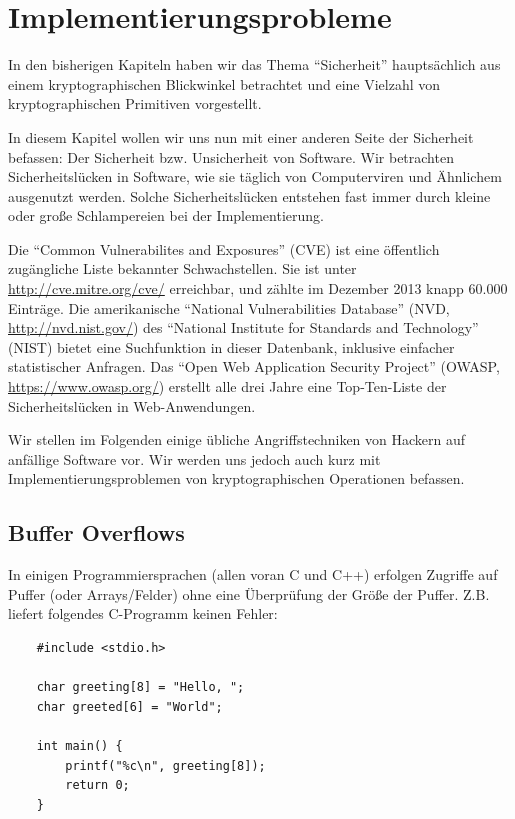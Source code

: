 
\chapter{Implementierungsprobleme}

In den bisherigen Kapiteln haben wir das Thema "`Sicherheit"' hauptsächlich aus einem kryptographischen Blickwinkel betrachtet und eine Vielzahl von kryptographischen Primitiven vorgestellt.

In diesem Kapitel wollen wir uns nun mit einer anderen Seite der Sicherheit befassen: Der Sicherheit bzw. Unsicherheit von Software. Wir betrachten Sicherheitslücken in Software, wie sie täglich von Computerviren und Ähnlichem ausgenutzt werden. Solche Sicherheitslücken entstehen fast immer durch kleine oder große Schlampereien bei der Implementierung.

Die "`Common Vulnerabilites and Exposures"' (CVE) ist eine öffentlich zugängliche Liste bekannter Schwachstellen.
Sie ist unter \url{http://cve.mitre.org/cve/} erreichbar, und zählte im Dezember 2013 knapp 60.000 Einträge.
Die amerikanische "`National Vulnerabilities Database"' (NVD, \url{http://nvd.nist.gov/}) des "`National Institute for Standards and Technology"' (NIST) bietet eine Suchfunktion in dieser Datenbank, inklusive einfacher statistischer Anfragen.
Das "`Open Web Application Security Project"' (OWASP, \url{https://www.owasp.org/}) erstellt alle drei Jahre eine Top-Ten-Liste der Sicherheitslücken in Web-Anwendungen.

Wir stellen im Folgenden einige übliche Angriffstechniken von Hackern auf anfällige Software vor. Wir werden uns jedoch auch kurz mit Implementierungsproblemen von kryptographischen Operationen befassen.

\section{Buffer Overflows}
In einigen Programmiersprachen (allen voran C und C++) erfolgen Zugriffe auf Puffer (oder Arrays/Felder) ohne eine Überprüfung der Größe der Puffer. Z.B. liefert folgendes C-Programm keinen Fehler:


\begin{lstlisting}
	#include <stdio.h>
	
	char greeting[8] = "Hello, ";
	char greeted[6] = "World";
	
	int main() {
		printf("%c\n", greeting[8]);
		return 0;
	}
\end{lstlisting}


